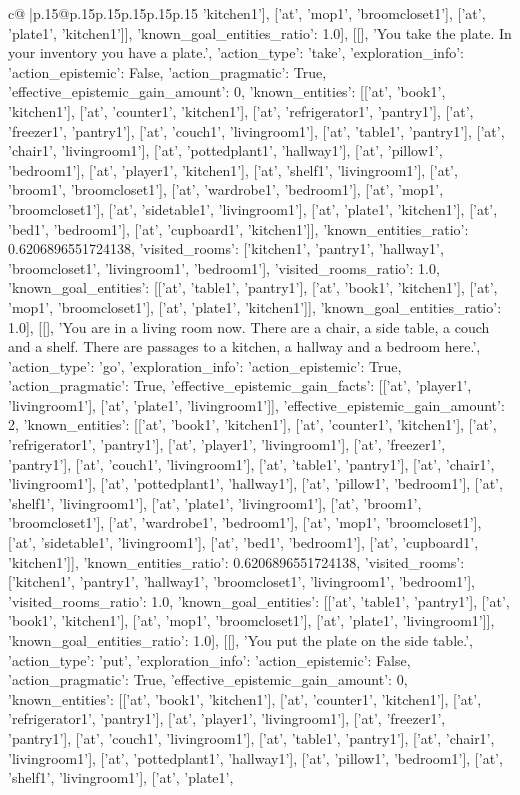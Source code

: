 \documentclass{article}
\begin{document}
{\begin{supertabular}{c@{$\;$}|p{.15\linewidth}@{}p{.15\linewidth}p{.15\linewidth}p{.15\linewidth}p{.15\linewidth}p{.15\linewidth}}
{{{'kitchen1'], ['at', 'mop1', 'broomcloset1'], ['at', 'plate1', 'kitchen1']], 'known_goal_entities_ratio': 1.0}}], [[], 'You take the plate. In your inventory you have a plate.', {'action_type': 'take', 'exploration_info': {'action_epistemic': False, 'action_pragmatic': True, 'effective_epistemic_gain_amount': 0, 'known_entities': [['at', 'book1', 'kitchen1'], ['at', 'counter1', 'kitchen1'], ['at', 'refrigerator1', 'pantry1'], ['at', 'freezer1', 'pantry1'], ['at', 'couch1', 'livingroom1'], ['at', 'table1', 'pantry1'], ['at', 'chair1', 'livingroom1'], ['at', 'pottedplant1', 'hallway1'], ['at', 'pillow1', 'bedroom1'], ['at', 'player1', 'kitchen1'], ['at', 'shelf1', 'livingroom1'], ['at', 'broom1', 'broomcloset1'], ['at', 'wardrobe1', 'bedroom1'], ['at', 'mop1', 'broomcloset1'], ['at', 'sidetable1', 'livingroom1'], ['at', 'plate1', 'kitchen1'], ['at', 'bed1', 'bedroom1'], ['at', 'cupboard1', 'kitchen1']], 'known_entities_ratio': 0.6206896551724138, 'visited_rooms': ['kitchen1', 'pantry1', 'hallway1', 'broomcloset1', 'livingroom1', 'bedroom1'], 'visited_rooms_ratio': 1.0, 'known_goal_entities': [['at', 'table1', 'pantry1'], ['at', 'book1', 'kitchen1'], ['at', 'mop1', 'broomcloset1'], ['at', 'plate1', 'kitchen1']], 'known_goal_entities_ratio': 1.0}}], [[], 'You are in a living room now. There are a chair, a side table, a couch and a shelf. There are passages to a kitchen, a hallway and a bedroom here.', {'action_type': 'go', 'exploration_info': {'action_epistemic': True, 'action_pragmatic': True, 'effective_epistemic_gain_facts': [['at', 'player1', 'livingroom1'], ['at', 'plate1', 'livingroom1']], 'effective_epistemic_gain_amount': 2, 'known_entities': [['at', 'book1', 'kitchen1'], ['at', 'counter1', 'kitchen1'], ['at', 'refrigerator1', 'pantry1'], ['at', 'player1', 'livingroom1'], ['at', 'freezer1', 'pantry1'], ['at', 'couch1', 'livingroom1'], ['at', 'table1', 'pantry1'], ['at', 'chair1', 'livingroom1'], ['at', 'pottedplant1', 'hallway1'], ['at', 'pillow1', 'bedroom1'], ['at', 'shelf1', 'livingroom1'], ['at', 'plate1', 'livingroom1'], ['at', 'broom1', 'broomcloset1'], ['at', 'wardrobe1', 'bedroom1'], ['at', 'mop1', 'broomcloset1'], ['at', 'sidetable1', 'livingroom1'], ['at', 'bed1', 'bedroom1'], ['at', 'cupboard1', 'kitchen1']], 'known_entities_ratio': 0.6206896551724138, 'visited_rooms': ['kitchen1', 'pantry1', 'hallway1', 'broomcloset1', 'livingroom1', 'bedroom1'], 'visited_rooms_ratio': 1.0, 'known_goal_entities': [['at', 'table1', 'pantry1'], ['at', 'book1', 'kitchen1'], ['at', 'mop1', 'broomcloset1'], ['at', 'plate1', 'livingroom1']], 'known_goal_entities_ratio': 1.0}}], [[], 'You put the plate on the side table.', {'action_type': 'put', 'exploration_info': {'action_epistemic': False, 'action_pragmatic': True, 'effective_epistemic_gain_amount': 0, 'known_entities': [['at', 'book1', 'kitchen1'], ['at', 'counter1', 'kitchen1'], ['at', 'refrigerator1', 'pantry1'], ['at', 'player1', 'livingroom1'], ['at', 'freezer1', 'pantry1'], ['at', 'couch1', 'livingroom1'], ['at', 'table1', 'pantry1'], ['at', 'chair1', 'livingroom1'], ['at', 'pottedplant1', 'hallway1'], ['at', 'pillow1', 'bedroom1'], ['at', 'shelf1', 'livingroom1'], ['at', 'plate1', }}}
\end{supertabular}}
\end{document}
